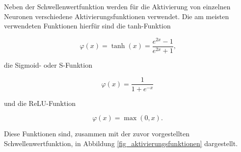 Neben der Schwellenwertfunktion werden für die Aktivierung von einzelnen Neuronen verschiedene Aktivierungsfunktionen verwendet. Die am meisten verwendeten Funktionen hierfür sind die \ac{tanh}-Funktion

\begin{equation}
\varphi(x) = \tanh(x) = \frac{e^{2x}-1}{e^{2x}+1} \text{,}
\end{equation}

\noindent die Sigmoid- oder S-Funktion

\begin{equation}
\varphi(x) = \frac{1}{1+e^{-x}}
\end{equation}

\noindent und die \ac{ReLU}-Funktion 

\begin{equation}
\varphi(x) = \max{(0, x)}.
\end{equation}

\noindent Diese Funktionen sind, zusammen mit der zuvor vorgestellten Schwellenwertfunktion, in Abbildung \ref{fig_aktivierungsfunktionen} dargestellt.


